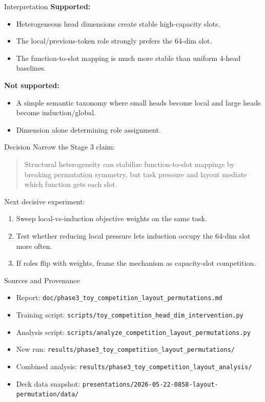 \documentclass[aspectratio=169]{beamer}
\begin{document}
\begin{frame}{Interpretation}
  \textbf{Supported:}
  \begin{itemize}
    \item Heterogeneous head dimensions create stable high-capacity slots.
    \item The local/previous-token role strongly prefers the 64-dim slot.
    \item The function-to-slot mapping is much more stable than uniform 4-head baselines.
  \end{itemize}

  \vspace{0.7em}
  \textbf{Not supported:}
  \begin{itemize}
    \item A simple semantic taxonomy where small heads become local and large heads become induction/global.
    \item Dimension alone determining role assignment.
  \end{itemize}
\end{frame}

\begin{frame}{Decision}
  Narrow the Stage 3 claim:

  \vspace{0.8em}
  \begin{quote}
    Structural heterogeneity can stabilize function-to-slot mappings by breaking
    permutation symmetry, but task pressure and layout mediate which function gets
    each slot.
  \end{quote}

  \vspace{0.8em}
  Next decisive experiment:
  \begin{enumerate}
    \item Sweep local-vs-induction objective weights on the same task.
    \item Test whether reducing local pressure lets induction occupy the 64-dim slot more often.
    \item If roles flip with weights, frame the mechanism as capacity-slot competition.
  \end{enumerate}
\end{frame}

\begin{frame}{Sources and Provenance}
  \scriptsize
  \begin{itemize}
    \item Report: \texttt{doc/phase3\_toy\_competition\_layout\_permutations.md}
    \item Training script: \texttt{scripts/toy\_competition\_head\_dim\_intervention.py}
    \item Analysis script: \texttt{scripts/analyze\_competition\_layout\_permutations.py}
    \item New run: \texttt{results/phase3\_toy\_competition\_layout\_permutations/}
    \item Combined analysis: \texttt{results/phase3\_toy\_competition\_layout\_analysis/}
    \item Deck data snapshot: \texttt{presentations/2026-05-22-0858-layout-permutation/data/}
  \end{itemize}
\end{frame}
\end{document}
